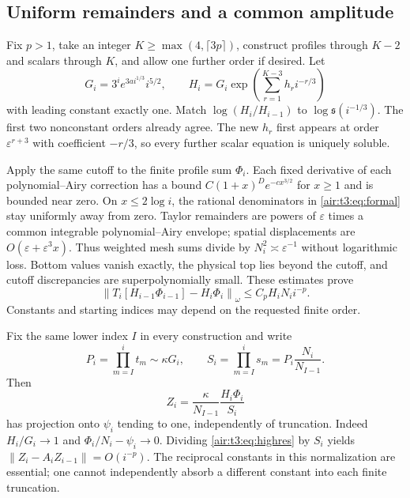 \documentclass[11pt,letterpaper]{article}
\numberwithin{equation}{section}
\theoremstyle{remark}
\newcommand{\norm}[1]{\left\lVert#1\right\rVert}
\newcommand{\eps}{\varepsilon}
\begin{document}
\subsection{Uniform remainders and a common amplitude}
Fix $p>1$, take an integer $K\ge\max(4,\lceil3p\rceil)$, construct profiles through $K-2$ and scalars through $K$, and allow one further order if desired. Let
\[
G_i=3^i e^{3a i^{1/3}}i^{5/2},\qquad
H_i=G_i\exp\left(\sum_{r=1}^{K-3}h_r i^{-r/3}\right)
\]
with leading constant exactly one. Match $\log(H_i/H_{i-1})$ to $\log\mathfrak s(i^{-1/3})$. The first two nonconstant orders already agree. The new $h_r$ first appears at order $\eps^{r+3}$ with coefficient $-r/3$, so every further scalar equation is uniquely soluble.

Apply the same cutoff to the finite profile sum $\Phi_i$. Each fixed derivative of each polynomial--Airy correction has a bound
$C(1+x)^D e^{-c x^{3/2}}$ for $x\ge1$ and is bounded near zero. On $x\le2\log i$, the rational denominators in \eqref{air:t3:eq:formal} stay uniformly away from zero. Taylor remainders are powers of $\eps$ times a common integrable polynomial--Airy envelope; spatial displacements are $O(\eps+\eps^3x)$. Thus weighted mesh sums divide by $N_i^2\asymp\eps^{-1}$ without logarithmic loss. Bottom values vanish exactly, the physical top lies beyond the cutoff, and cutoff discrepancies are superpolynomially small. These estimates prove
\begin{equation}\label{air:t3:eq:highres}
\norm{T_i[H_{i-1}\Phi_{i-1}]-H_i\Phi_i}_\omega
\le C_p H_iN_i i^{-p}.
\end{equation}
Constants and starting indices may depend on the requested finite order.

Fix the same lower index $I$ in every construction and write
\[
P_i=\prod_{m=I}^i t_m\sim\kappa G_i,\qquad
S_i=\prod_{m=I}^i s_m=P_i\frac{N_i}{N_{I-1}}.
\]
Then
\[
Z_i=\frac{\kappa}{N_{I-1}}\frac{H_i\Phi_i}{S_i}
\]
has projection onto $\psi_i$ tending to one, independently of truncation. Indeed $H_i/G_i\to1$ and $\Phi_i/N_i-\psi_i\to0$. Dividing \eqref{air:t3:eq:highres} by $S_i$ yields
$\norm{Z_i-A_iZ_{i-1}}=O(i^{-p})$.
The reciprocal constants in this normalization are essential; one cannot independently absorb a different constant into each finite truncation.
\end{document}
